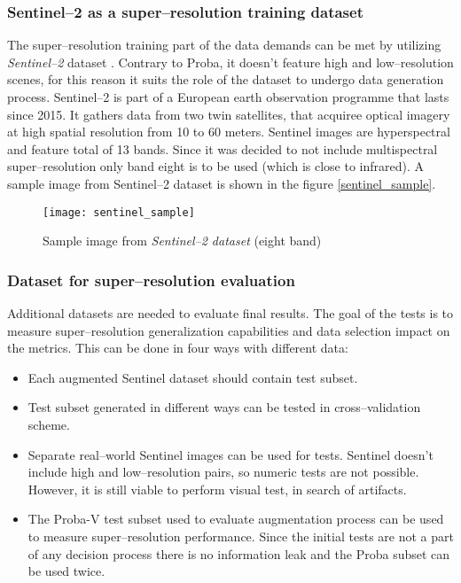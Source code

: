 \subsubsection{Sentinel--2 as a super--resolution training dataset}
The super--resolution training part of the data demands can be met by utilizing \textit{Sentinel--2} dataset \cite{esa-sentinel}.
Contrary to Proba, it doesn't feature high and low--resolution scenes, for this reason it suits the role of the dataset to undergo data generation process.
Sentinel--2 is part of a European earth observation programme that lasts since 2015.
It gathers data from two twin satellites, that acquiree optical imagery at high spatial resolution from 10 to 60 meters.
Sentinel images are hyperspectral and feature total of 13 bands.
Since it was decided to not include multispectral super--resolution only band eight is to be used (which is close to infrared).
A sample image from Sentinel--2 dataset is shown in the figure \ref{sentinel_sample}.
\begin{figure}
	\centering
    \texttt{[image: sentinel\_sample]}
    \caption{Sample image from \textit{Sentinel--2 dataset} (eight band)}
    \label{fig:sentinel_sample}
\end{figure}

\subsubsection{Dataset for super--resolution evaluation}
Additional datasets are needed to evaluate final results.
The goal of the tests is to measure super--resolution generalization capabilities and data selection impact on the metrics.
This can be done in four ways with different data:
\begin{itemize}
	\item Each augmented Sentinel dataset should contain test subset.
	\item Test subset generated in different ways can be tested in cross--validation scheme.
	\item Separate real--world Sentinel images can be used for tests. Sentinel doesn't include high and low--resolution pairs, so numeric tests are not possible. However, it is still viable to perform visual test, in search of artifacts.
	\item The Proba-V test subset used to evaluate augmentation process can be used to measure super--resolution performance. Since the initial tests are not a part of any decision process there is no information leak and the Proba subset can be used twice.
\end{itemize}

